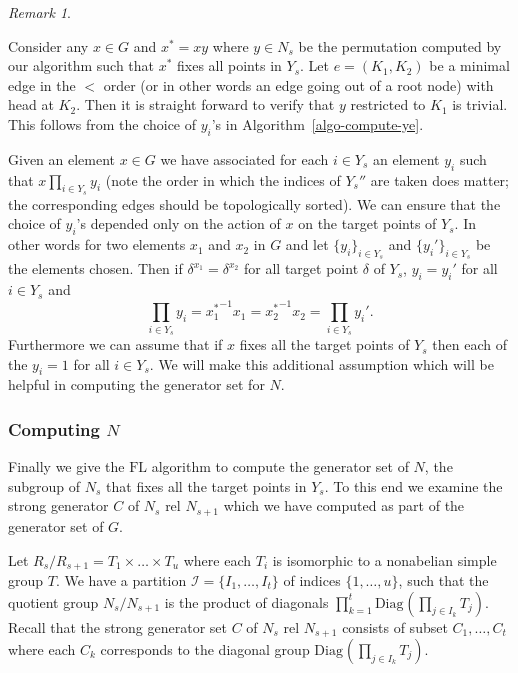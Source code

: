 \documentclass[11pt]{madras}%
\theoremstyle{remark}
\newtheorem{remark}[theorem]{Remark}
\newcommand{\Diag}[2][]{{\ensuremath{\mathrm{Diag}_{{#1}}\left(#2\right)}}}
\newcommand{\bigtimes}{\prod}
\begin{document}
\begin{remark}\label{rem-canonical-yi}

  Consider any $x \in G$ and $x^* = xy$ where $y \in N_s$ be the
  permutation computed by our algorithm such that $x^*$ fixes all
  points in $Y_s$. Let $e = (K_1,K_2)$ be a minimal edge in the $<$
  order (or in other words an edge going out of a root node) with head
  at $K_2$. Then it is straight forward to verify that $y$ restricted
  to $K_1$ is trivial. This follows from the choice of $y_i$'s in
  Algorithm~\ref{algo-compute-ye}.

  Given an element $x \in G$ we have associated for each $i \in Y_s$
  an element $y_i$ such that $x\prod_{i \in Y_s} y_i$ (note the order
  in which the indices of $Y_s''$ are taken does matter; the
  corresponding edges should be topologically sorted).  We can ensure
  that the choice of $y_i$'s depended only on the action of $x$ on the
  target points of $Y_s$. In other words for two elements $x_1$ and
  $x_2$ in $G$ and let $\{ y_i \}_{i \in Y_s}$ and $\{ y_i'\}_{i \in
    Y_s}$ be the elements chosen.  Then if $\delta^{x_1} =
  \delta^{x_2}$ for all target point $\delta$ of $Y_s$, $y_i = y_i'$
  for all $i \in Y_s$ and
  \[ 
  \prod_{i \in Y_s} y_i = {x_1^*}^{-1} x_1 = {x_2^*}^{-1}x_2 = \prod_{i
    \in Y_s} y_i'.
  \]
  Furthermore we can assume that if $x$ fixes all the target points of
  $Y_s$ then each of the $y_i = 1$ for all $i \in Y_s$. We will make
  this additional assumption which will be helpful in computing the
  generator set for $N$.
\end{remark}
\subsubsection{Computing $N$}

Finally we give the $\mathrm{FL}$ algorithm to compute the generator
set of $N$, the subgroup of $N_s$ that fixes all the target points in
$Y_s$.  To this end we examine the strong generator $C$ of $N_s$ rel
$N_{s+1}$ which we have computed as part of the generator set of $G$.

Let $R_s/R_{s+1} = T_1\times \ldots \times T_u$ where each $T_i$ is
isomorphic to a nonabelian simple group $T$. We have a partition
$\mathcal{I} = \{ I_1,\ldots, I_t \}$ of indices $\{1,\ldots, u\}$,
such that the quotient group $N_s/N_{s+1}$ is the product of diagonals
$\prod_{k=1}^{t} \Diag{\bigtimes_{j \in I_k} T_j}$.  Recall that the
strong generator set $C$ of $N_s$ rel $N_{s+1}$ consists of subset
$C_1,\ldots,C_{t}$ where each $C_k$ corresponds to the diagonal group
$\Diag{\bigtimes_{j \in I_k} T_j}$.
\end{document}
